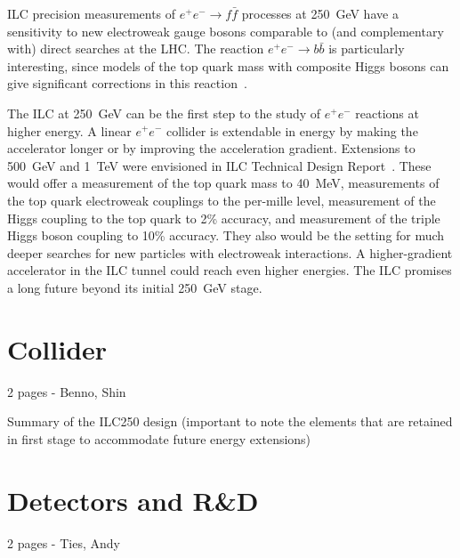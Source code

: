 \documentclass[%
 reprint,
 amsmath,amssymb,
 aps,
]{revtex4-1}
\def\ee{e^+e^-}
\begin{document}
 ILC precision
measurements of $\ee\to f\bar f$ processes at 250~GeV have a sensitivity to new
electroweak gauge bosons comparable to (and complementary with) 
direct searches at the LHC.  The reaction $\ee\to b\bar b$ is
particularly interesting, since models of the top quark mass with
composite Higgs bosons can give significant corrections in this
reaction~\cite{eetobb}.

The ILC at 250~GeV can be the first step to the study of $\ee$
reactions at higher energy.   A linear $\ee$ collider is extendable in
energy by making the accelerator longer or by improving the
acceleration gradient. Extensions to 500~GeV and 1~TeV were envisioned
in ILC Technical Design Report~\cite{Behnke:2013xla}.    These would offer a
measurement of the top quark mass to 40~MeV, measurements of the top
quark electroweak couplings to the per-mille level, measurement of the
Higgs coupling to the top quark to 2\% accuracy, and measurement of
the triple Higgs boson coupling to 10\%  accuracy. They  also would be
the setting for much 
deeper searches for new particles with electroweak interactions.
A higher-gradient accelerator in the ILC tunnel could reach even
higher energies.  The
ILC promises a long future beyond its initial 250~GeV stage.




\section{\label{sec:collider}Collider}

2 pages - Benno, Shin

    Summary of the ILC250 design (important to note the elements that are retained in first stage to accommodate future energy extensions)

\section{\label{sec:detect}Detectors and R\&D}

2 pages - Ties, Andy
\end{document}
